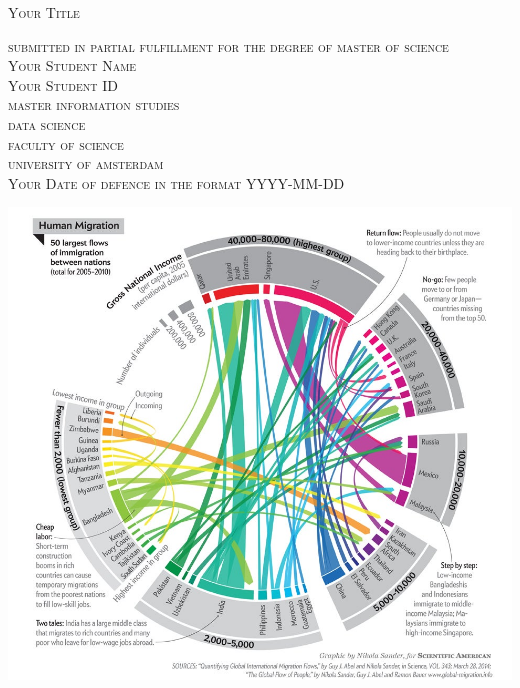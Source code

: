 \begin{titlepage}


\begin{center}
 
\textsc{\Large   Your Title }

\bigskip

\textsc{\large
submitted in partial fulfillment for the degree of master of science\\
%
\bigskip
Your Student Name\\
%
Your Student ID\\
%
\bigskip
master information studies\\
%
data science \\
%
faculty of science\\
%
university of amsterdam\\
%
\bigskip
Your Date of defence in the format YYYY-MM-DD
}

\end{center}
 
\vfill

\begin{center}
\includegraphics[height=.4\textheight]{TitlePages/logos/cover.jpeg} %
\end{center}

\vfill


\end{titlepage}
